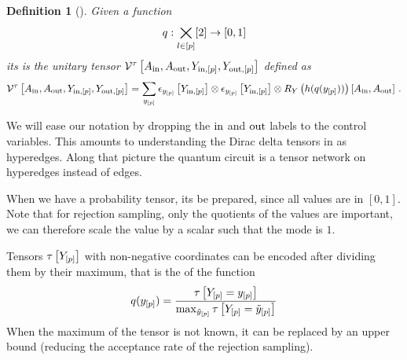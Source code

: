 \documentclass[aps,onecolumn,nofootinbib,pra]{article}
\newtheorem{definition}{Definition}
\begin{document}
    \begin{definition}[\ActivationCircuit{}]
        Given a function
        \begin{align*}
            q : \bigtimes_{l\in[p]} [2] \rightarrow [0,1]
        \end{align*}
        its \activationCircuit{} is the unitary tensor
        $\mathcal{V}^{\tau}\left[A_{\mathrm{in}},A_{\mathrm{out}},Y_{\mathrm{in},[p]},Y_{\mathrm{out},[p]}\right]$ defined as
        \begin{align*}
            \mathcal{V}^{\tau}\left[A_{\mathrm{in}},A_{\mathrm{out}},Y_{\mathrm{in},[p]},Y_{\mathrm{out},[p]}\right]
            = \sum_{y_{[p]}} \epsilon_{y_{[p]}}\left[Y_{\mathrm{in},[p]}\right]
            \otimes \epsilon_{y_{[p]}}\left[Y_{\mathrm{in},[p]}\right]
            \otimes R_Y\left({h(q(y_{[p]}))}\right)\left[A_{\mathrm{in}},A_{\mathrm{out}}\right] \, .
        \end{align*}
    \end{definition}

    We will ease our notation by dropping the $\mathrm{in}$ and $\mathrm{out}$ labels to the control variables.
    This amounts to understanding the Dirac delta tensors in \activationCircuits{} as hyperedges.
    Along that picture the quantum circuit is a tensor network on hyperedges instead of edges.


    When we have a probability tensor, its \activationCircuit{} be prepared, since all values are in $[0,1]$.
    Note that for rejection sampling, only the quotients of the values are important, we can therefore scale the value by a scalar such that the mode is $1$.

    Tensors $\tau\left[Y_{[p]}\right]$ with non-negative coordinates can be encoded after dividing them by their maximum, that is the \activationCircuit{} of the function
    \begin{align*}
        q(y_{[p]}) = \frac{\tau\left[Y_{[p]}=y_{[p]}\right]}{\max_{\tilde{y}_{[p]}} \tau\left[Y_{[p]}=\tilde{y}_{[p]}\right]}
    \end{align*}
    When the maximum of the tensor is not known, it can be replaced by an upper bound (reducing the acceptance rate of the rejection sampling).
\end{document}
